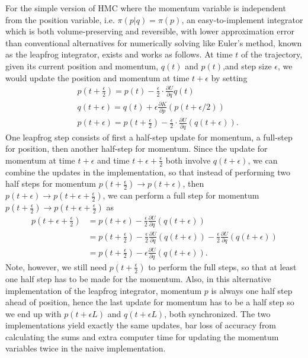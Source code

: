 \documentclass[12pt]{report}
\begin{document}
For the simple version of HMC where the momentum variable is independent from the position variable, i.e. $\pi(p|q)=\pi(p)$, an easy-to-implement integrator which is both volume-preserving and reversible, with lower approximation error than conventional alternatives for numerically solving like Euler's method, known as the leapfrog integrator, exists and works as follows. At time $t$ of the trajectory, given its current position and momentum, $q(t)$ and $p(t)$,and step size $\epsilon$, we would update the position and momentum at time $t+\epsilon$ by setting 
\begin{align*}
    &p(t+\frac{\epsilon}{2}) = p(t) - \frac{\epsilon}{2}\cdot \frac{\partial
    U}{\partial
    q}q(t) \\
    &q(t+\epsilon) = q(t) + \epsilon  \frac{\partial K}{\partial p}(p(t+\epsilon/2))
    \\
    &p(t+\epsilon) = p(t + \frac{\epsilon}{2}) - \frac{\epsilon} {2} \cdot \frac{\partial U}{\partial
    q}(q(t+\epsilon)).
\end{align*}
One leapfrog step consists of first a half-step update for momentum, a full-step
for position, then another half-step for momentum. Since the update for momentum
at time $t+\epsilon$ and time $t+\epsilon + \frac{\epsilon}{2}$ both involve
$q(t+\epsilon)$,  we can combine the updates in the implementation, so that instead of performing two half steps for momentum $p(t+\frac{\epsilon}{2}) \rightarrow p(t+\epsilon)$, then $ p(t+\epsilon) \rightarrow p(t+\epsilon + \frac{\epsilon}{2})$, we can perform a full step for momentum $p(t+\frac{\epsilon}{2}) \rightarrow p(t+ \epsilon + \frac{\epsilon}{2}) $ as 
\begin{align}
p(t+\epsilon + \frac{\epsilon}{2})  
&= p(t+\epsilon) - \frac{\epsilon}{2} \frac{\partial U}{\partial q }(q(t+\epsilon)) \\
&= p(t+\frac{\epsilon}{2}) - \frac{\epsilon}{2} \frac{\partial U}{\partial q }(q(t+\epsilon)) - \frac{\epsilon}{2} \frac{\partial U}{\partial q }(q(t+\epsilon)) \\
&= p(t+\frac{\epsilon}{2}) - \epsilon \frac{\partial U}{\partial q }(q(t+\epsilon)).
\end{align}
Note, however, we still need $p(t+\frac{\epsilon}{2})$ to perform the full
steps, so that at least one half step has to be made for the momentum. Also, in
this alternative implementation of the leapfrog integrator, momentum $p$ is
always one half step ahead of position, hence the last update for momentum has
to be a half step so we end up with $p(t+\epsilon L)$ and $q(t+\epsilon L )$,
both synchronized. The two implementations yield exactly the same updates, bar
loss of accuracy from calculating the sums and extra computer time for updating
the momentum variables twice in the naive implementation. 
\end{document}
